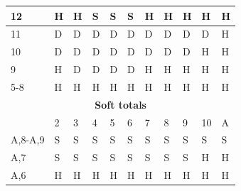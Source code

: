 \documentclass[conference]{IEEEtran}
\begin{document}
\begin{table}[ht]
\begin{tabular}{|l|l|l|l|l|l|l|l|l|l|l|}
12                           & \cellcolor{green!50}H & \cellcolor{green!50}H & \cellcolor{red!75}S & \cellcolor{red!75}S & \cellcolor{red!75}S & \cellcolor{green!50}H & \cellcolor{green!50}H & \cellcolor{green!50}H & \cellcolor{green!50}H & \cellcolor{green!50}H  \\ \hline
11                           & \cellcolor{blue!25}D & \cellcolor{blue!25}D & \cellcolor{blue!25}D & \cellcolor{blue!25}D & \cellcolor{blue!25}D & \cellcolor{blue!25}D & \cellcolor{blue!25}D & \cellcolor{blue!25}D & \cellcolor{blue!25}D & \cellcolor{green!50}H  \\ \hline
10                           & \cellcolor{blue!25}D & \cellcolor{blue!25}D & \cellcolor{blue!25}D & \cellcolor{blue!25}D & \cellcolor{blue!25}D & \cellcolor{blue!25}D & \cellcolor{blue!25}D & \cellcolor{blue!25}D & \cellcolor{green!50}H & \cellcolor{green!50}H \\ \hline
9                            & \cellcolor{green!50}H & \cellcolor{blue!25}D & \cellcolor{blue!25}D & \cellcolor{blue!25}D & \cellcolor{blue!25}D & \cellcolor{green!50}H & \cellcolor{green!50}H & \cellcolor{green!50}H & \cellcolor{green!50}H & \cellcolor{green!50}H  \\ \hline
5-8                          & \cellcolor{green!50}H & \cellcolor{green!50}H & \cellcolor{green!50}H & \cellcolor{green!50}H & \cellcolor{green!50}H & \cellcolor{green!50}H & \cellcolor{green!50}H & \cellcolor{green!50}H & \cellcolor{green!50}H & \cellcolor{green!50}H \\ \hline \hline
\multicolumn{11}{|c|}{\textbf{Soft totals}}                           \\ \hline
                             & 2 & 3 & 4 & 5 & 6 & 7 & 8 & 9 & 10 & A \\ \hline
A,8-A,9                      & \cellcolor{red!75}S & \cellcolor{red!75}S & \cellcolor{red!75}S & \cellcolor{red!75}S & \cellcolor{red!75}S & \cellcolor{red!75}S & \cellcolor{red!75}S & \cellcolor{red!75}S & \cellcolor{red!75}S & \cellcolor{red!75}S  \\ \hline
A,7                          & \cellcolor{red!75}S & \cellcolor{red!75}S & \cellcolor{red!75}S & \cellcolor{red!75}S & \cellcolor{red!75}S & \cellcolor{red!75}S & \cellcolor{red!75}S & \cellcolor{red!75}S & \cellcolor{green!50}H & \cellcolor{green!50}H  \\ \hline
A,6                          & \cellcolor{green!50}H & \cellcolor{green!50}H & \cellcolor{green!50}H & \cellcolor{green!50}H & \cellcolor{green!50}H & \cellcolor{green!50}H & \cellcolor{green!50}H & \cellcolor{green!50}H & \cellcolor{green!50}H & \cellcolor{green!50}H  \\ \hline

\end{tabular}
\end{table}
\end{document}
